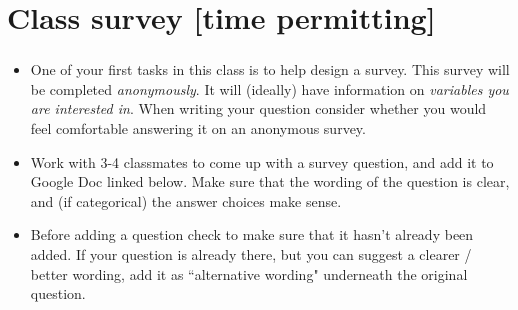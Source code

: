 \documentclass[slidestop,compress,mathserif,12pt,t,professionalfonts,xcolor=table]{beamer}
\begin{document}

\section{Class survey [time permitting]}


\begin{frame}
\frametitle{}

{
\begin{itemize}
    \setlength{\itemsep}{0pt}
    \setlength{\parskip}{0pt}
\item One of your first tasks in this class is to help design a survey. This survey will be completed \emph{anonymously}. It will (ideally) have information on \emph{variables you are interested in}. When writing your question consider whether you would feel comfortable answering it on an anonymous survey.

\item Work with 3-4 classmates to come up with a survey question, and add it to Google Doc linked below. Make sure that the wording of the question is clear, and (if categorical) the answer choices make sense.
\begin{center}
\end{center}

\item Before adding a question check to make sure that it hasn't already been added. If your question is already there, but you can suggest a clearer / better wording, add it as ``alternative wording" underneath the original question.
\end{itemize}
}

\end{frame}

\end{document}
